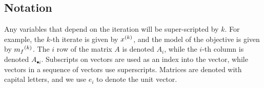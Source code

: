   
% 
% 
% 
% 
% 
% 
% 

\subsection{Notation}

Any variables that depend on the iteration will be super-scripted by $k$.
For example, the $k$-th iterate is given by ${x}^{(k)}$, and the model of the objective is given by ${{m}_f}^{(k)}$.
The $i$ row of the matrix $A$ is denoted $A_i$, while the $i$-th column is denoted $A_{\bullet i}$.
Subscripts on vectors are used as an index into the vector, while vectors in a sequence of vectors use superscripts.
Matrices are denoted with capital letters, and we use $e_i$ to denote the unit vector.                     %

